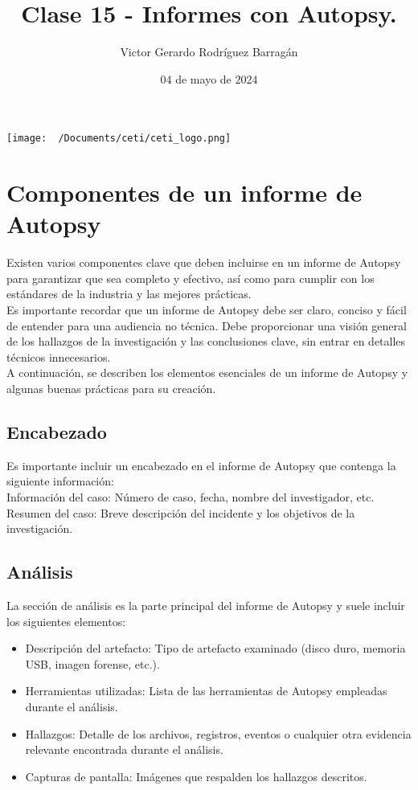 \documentclass{article}
\title{Clase 15 - Informes con Autopsy.}
\author{Victor Gerardo Rodríguez Barragán}
\date{04 de mayo de 2024}
\begin{document}
\maketitle
\justify
\vspace{0.5cm}
\begin{center}
\texttt{[image: ~/Documents/ceti/ceti\_logo.png]}
\end{center}
\newpage
\section{Componentes de un informe de Autopsy}
Existen varios componentes clave que deben incluirse
en un informe de Autopsy para garantizar que sea
completo y efectivo, así como para cumplir con los
estándares de la industria y las mejores prácticas.
\vspace{0.5cm}\\
Es importante recordar que un informe de Autopsy
debe ser claro, conciso y fácil de entender para
una audiencia no técnica. Debe proporcionar una
visión general de los hallazgos de la investigación
y las conclusiones clave, sin entrar en detalles
técnicos innecesarios.
\vspace{0.5cm}\\
A continuación, se describen los elementos esenciales
de un informe de Autopsy y algunas buenas prácticas
para su creación.

\subsection{Encabezado}
Es importante incluir un encabezado en el informe de Autopsy
que contenga la siguiente información:
\vspace{0.5cm}\\
Información del caso: Número de caso, fecha, nombre del investigador, etc.
\vspace{0.5cm}\\
Resumen del caso: Breve descripción del incidente y los objetivos de la investigación.

\subsection{Análisis}
La sección de análisis es la parte principal del informe de
Autopsy y suele incluir los siguientes elementos:
\begin{itemize}
    \item
    Descripción del artefacto: Tipo de artefacto examinado (disco duro, memoria USB, imagen forense, etc.).
    \item
    Herramientas utilizadas: Lista de las herramientas de Autopsy empleadas durante el análisis.
    \item
    Hallazgos: Detalle de los archivos, registros, eventos o cualquier otra evidencia relevante encontrada durante el análisis.
    \item
    Capturas de pantalla: Imágenes que respalden los hallazgos descritos.
\end{itemize}
\end{document}
